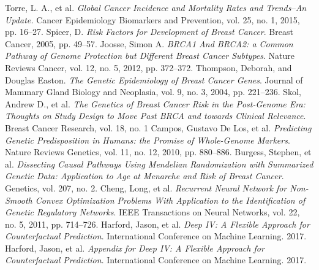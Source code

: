 \documentclass[10.5pt, oneside, twocolumn]{article}   	%
\begin{document}
\pagebreak
\onecolumn
\begin{thebibliography}{9}
Torre, L. A., et al.
\textit{Global Cancer Incidence and Mortality Rates and Trends--An Update.}
Cancer Epidemiology Biomarkers and Prevention, vol. 25, no. 1, 2015, pp. 16–27.
Spicer, D.
\textit{Risk Factors for Development of Breast Cancer}.
Breast Cancer, 2005, pp. 49–57.
Joosse, Simon A.
\textit{BRCA1 And BRCA2: a Common Pathway of Genome Protection but Different Breast Cancer Subtypes}.
Nature Reviews Cancer, vol. 12, no. 5, 2012, pp. 372–372.
Thompson, Deborah, and Douglas Easton.
\textit{The Genetic Epidemiology of Breast Cancer Genes}.
Journal of Mammary Gland Biology and Neoplasia, vol. 9, no. 3, 2004, pp. 221–236.
Skol, Andrew D., et al.
\textit{The Genetics of Breast Cancer Risk in the Post-Genome Era: Thoughts on Study Design to Move Past BRCA and towards Clinical Relevance}.
Breast Cancer Research, vol. 18, no. 1
Campos, Gustavo De Los, et al.
\textit{Predicting Genetic Predisposition in Humans: the Promise of Whole-Genome Markers}.
Nature Reviews Genetics, vol. 11, no. 12, 2010, pp. 880–886.
Burgess, Stephen, et al.
\textit{Dissecting Causal Pathways Using Mendelian Randomization with Summarized Genetic Data: Application to Age at Menarche and Risk of Breast Cancer}.
Genetics, vol. 207, no. 2.
Cheng, Long, et al.
\textit{Recurrent Neural Network for Non-Smooth Convex Optimization Problems With Application to the Identification of Genetic Regulatory Networks}.
IEEE Transactions on Neural Networks, vol. 22, no. 5, 2011, pp. 714–726.
Harford, Jason, et al.
\textit{Deep IV: A Flexible Approach for Counterfactual Prediction}.
International Conference on Machine Learning. 2017. 
Harford, Jason, et al.
\textit{Appendix for Deep IV: A Flexible Approach for Counterfactual Prediction}.
International Conference on Machine Learning. 2017. 

\end{thebibliography}
\end{document}
